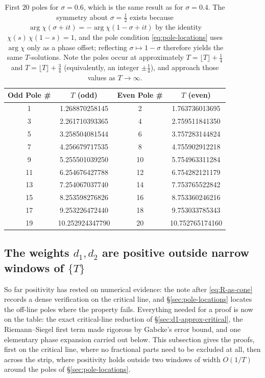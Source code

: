 \documentclass[11pt]{article}
\theoremstyle{definition}
\begin{document}
\begin{table}[h!]
\centering
\begin{tabular}{|c|c|c|c|}
\hline
\textbf{Odd Pole \#} & \textbf{$T$ (odd)} & \textbf{Even Pole \#} & \textbf{$T$ (even)} \\ \hline
1  & 1.268870258145  & 2  & 1.763736013695 \\
3  & 2.261710393365  & 4  & 2.759511841350 \\
5  & 3.258504081544  & 6  & 3.757283144824 \\
7  & 4.256679717535  & 8  & 4.755902912218 \\
9  & 5.255501039250  & 10 & 5.754963311284 \\
11 & 6.254676427788  & 12 & 6.754282121179 \\
13 & 7.254067037740  & 14 & 7.753765522842 \\
15 & 8.253598276826  & 16 & 8.753360246216 \\
17 & 9.253226472440  & 18 & 9.753033785343 \\
19 & 10.252924347790 & 20 & 10.752765174160 \\
\hline
\end{tabular}
\caption{First $20$ poles for $\sigma=0.6$, which is the same result as
for $\sigma=0.4$. The symmetry about $\sigma=\tfrac12$ exists because
$\arg\chi(\sigma+it)=-\arg\chi(1-\sigma+it)$ by the identity
$\chi(s)\,\chi(1-s)=1$, and the pole condition
\eqref{eq:pole-locations} uses $\arg\chi$ only as a phase offset;
reflecting $\sigma\mapsto1-\sigma$ therefore yields the same
$T$-solutions. Note the poles occur at approximately
$T=\lfloor T\rfloor+\tfrac14$ and $T=\lfloor T\rfloor+\tfrac34$
(equivalently, an integer $\pm\tfrac14$), and approach those values as
$T\to\infty$.}
\label{tab:poles}
\end{table}

\subsection{The weights \texorpdfstring{$d_1,d_2$}{d1, d2} are positive outside narrow windows of \texorpdfstring{$\{T\}$}{the fractional part of T}}\label{sec:d1-positive}

So far positivity has rested on numerical evidence: the note after
\eqref{eq:R-as-cone} records a dense verification on the critical line, and
\S\ref{sec:pole-locations} locates the off-line poles where the property
fails. Everything needed for a proof is now on the table: the exact
critical-line reduction of \S\ref{sec:d1-approx-critical}, the
Riemann--Siegel first term made rigorous by Gabcke's error bound, and one
elementary phase expansion carried out below. This subsection gives the
proofs, first on the critical line, where no fractional parts need to be
excluded at all, then across the strip, where positivity holds outside two
windows of width $O(1/T)$ around the poles of \S\ref{sec:pole-locations}.
\end{document}
